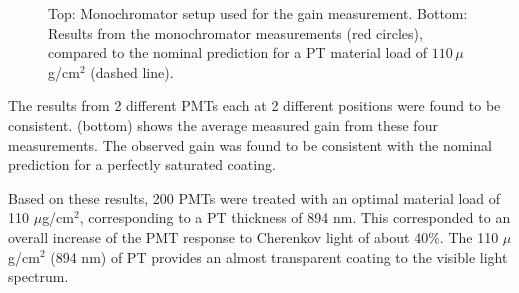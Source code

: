 \begin{figure}
	\caption{Top: Monochromator setup used for the gain measurement. Bottom: Results from the monochromator measurements (red circles), compared to the
				nominal prediction for a PT material load of $110\,\mu$ g/cm$^2$ (dashed line).}
	\label{fig:pmtTestingSetupAndptQEResults}
\end{figure}

The results from 2 different PMTs each at 2 different positions were found to be
consistent.  (bottom) shows the average measured gain from these four
measurements. The observed gain was found to be consistent with the nominal
prediction for a perfectly saturated coating.

Based on these results, 200 PMTs were treated \cite{Joosten:2016lcl} with an optimal material load of 110 $\mu$g/cm$^2$,
corresponding to a PT thickness of 894 nm. This corresponded to an overall
increase of the PMT response to Cherenkov light of about 40\%. The 110 $\mu$ g/cm$^2$ (894 nm) of PT provides an
almost transparent coating to the visible light spectrum.





